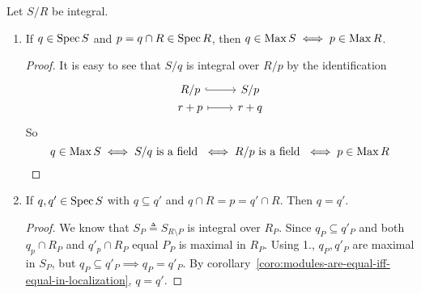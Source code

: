 \begin{prop} \label{prop:property-of-contraction-if-integral}
  Let $S/R$ be integral.
  \begin{enumerate}
    \item If $q \in \operatorname{Spec} S$ and $p = q \cap R \in \operatorname{Spec} R$, then
      $q \in \operatorname{Max} S \iff p \in \operatorname{Max} R$.

    \begin{proof}
      It is easy to see that $S/q$ is integral over $R/p$ by the identification
      \[
        \begin{tikzcd}[column sep=0.8cm,row sep=0ex]
          R/p \arrow[r, hookrightarrow] & S/p \\
          r+p \arrow[r, mapsto] & r+q
        \end{tikzcd}
      \]
      So \[ q \in \operatorname{Max} S \iff S/q \text{ is a field } \iff R/p \text{ is a field } \iff p \in \operatorname{Max} R \]
    \end{proof}
    \item If $q, q' \in \operatorname{Spec} S$ with $q \subseteq q'$ and $q \cap R = p = q' \cap R$.
      Then $q = q'$.
    \begin{proof}
      We know that $S_P \triangleq S_{R \setminus P}$ is integral over $R_P$.
      Since $q_P \subseteq q'_P$ and both $q_p \cap R_P$ and $q'_p \cap R_P$
      equal $P_P$ is maximal in $R_P$. Using 1., $q_P, q'_P$ are maximal
      in $S_P$, but $q_P \subseteq q'_P \implies q_P = q'_P$.
      By corollary~\ref{coro:modules-are-equal-iff-equal-in-localization},
      $q = q'$.
    \end{proof}
  \end{enumerate}

\end{prop}

